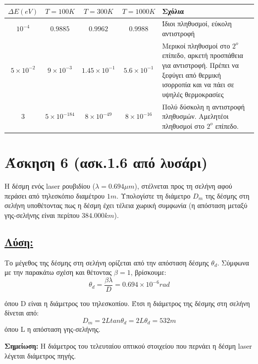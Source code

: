 \documentclass[a4paper,11pt,titlepage]{article}
\begin{document}
\begin{table}[h!]
\begin{center}
    \begin{tabular}{ | c | c | c | c | p{5cm} |}
    \hline
     ${\Delta}E (eV)$	& $T=100K$		& $T=300K$ 		& $T=1000K$		& Σχόλια\\ \hline
     $10^{-4}$		& $0.9885$		& $0.9962$		& $0.9988$		& Ίδιοι πληθυσμοί, εύκολη αντιστροφή\\ \hline
     $5\times10^{-2}$	& $9\times10^{-3}$	& $1.45\times10^{-1}$	& $5.6\times10^{-1}$	& Μερικοί πληθυσμοί στο $2^ο$ επίπεδο, αρκετή προσπάθεια για αντιστροφή. Πρέπει να ξεφύγει από θερμική ισορροπία και να πάει σε υψηλές θερμοκρασίες\\ \hline
     $3$			& $5\times10^{-184}$	& $8\times10^{-49}$	& $8\times10^{-16}$	& Πολύ δύσκολη η αντιστροφή πληθυσμών. Αμελητέοι πληθυσμοί στο $2^ο$ επίπεδο.\\ \hline
    \end{tabular}
\end{center}
\end{table}
\newpage
\section{Άσκηση 6 (ασκ.1.6 από λυσάρι)}

Η δέσμη ενός laser ρουβιδίου ($\lambda=0.694{\mu}m$), στέλνεται προς τη σελήνη αφού περάσει από τηλεσκόπιο διαμέτρου $1m$. Υπολογίστε τη διάμετρο $D_m$ της δέσμης στη σελήνη υποθέτοντας πως η δέσμη έχει τέλεια χωρική συμφωνία (η απόσταση μεταξύ γης-σελήνης είναι περίπου $384.000km$).
\subsection*{\underline{Λύση:}}

Το μέγεθος της δέσμης στη σελήνη ορίζεται από την απόσταση δέσμης $\theta_d$. Σύμφωνα με την παρακάτω σχέση και θέτοντας $\beta=1$, βρίσκουμε:
\begin{equation}
 \theta_d=\frac{\beta\lambda}{D}=0.694\times10^{-6} rad
\end{equation}

όπου D είναι η διάμετρος του τηλεσκοπίου. Έτσι η διάμετρος της δέσμης στη σελήνη δίνεται από:
\begin{equation}
 D_m=2Ltan{\theta_d}=2L\theta_d=532m
\end{equation}
όπου L η απόσταση γης-σελήνης.

\textbf{Σημείωση:} Η διάμετρος του τελευταίου οπτικού στοιχείου που περνάει η δέσμη laser λέγεται διάμετρος πηγής.
\end{document}
